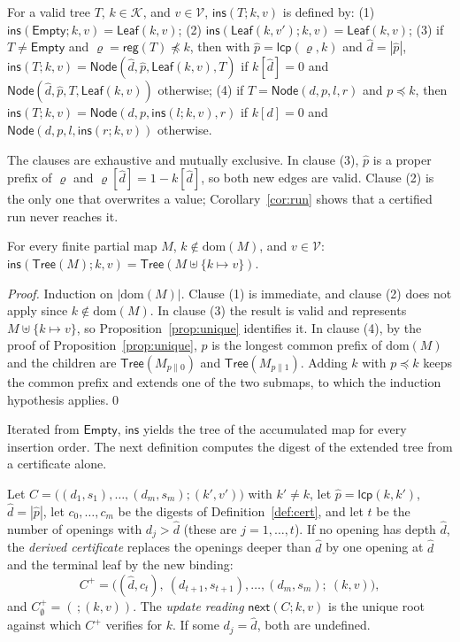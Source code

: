 \documentclass[runningheads]{llncs}
\newcommand{\Tree}{\mathsf{Tree}}
\newcommand{\Leaf}{\mathsf{Leaf}}
\newcommand{\Node}{\mathsf{Node}}
\newcommand{\Empty}{\mathsf{Empty}}
\newcommand{\reg}{\mathsf{reg}}
\newcommand{\ins}{\mathsf{ins}}
\newcommand{\nxt}{\mathsf{next}}
\newcommand{\lcp}{\mathsf{lcp}}
\newcommand{\dom}{\mathrm{dom}}
\newcommand{\cat}{\mathbin{\|}}
\newcommand{\K}{\mathcal{K}}
\newcommand{\V}{\mathcal{V}}
\begin{document}
\begin{definition}[Insertion]\label{def:ins}
For a valid tree $T$, $k \in \K$, and $v \in \V$, $\ins(T;k,v)$ is defined by:
(1) $\ins(\Empty;k,v) = \Leaf(k,v)$;
(2) $\ins(\Leaf(k,v');k,v) = \Leaf(k,v)$;
(3) if $T \neq \Empty$ and $\varrho = \reg(T) \not\preceq k$, then with $\hat p = \lcp(\varrho,k)$ and $\hat d = |\hat p|$, $\ins(T;k,v) = \Node(\hat d,\hat p,\Leaf(k,v),T)$ if $k[\hat d] = 0$ and $\Node(\hat d,\hat p,T,\Leaf(k,v))$ otherwise;
(4) if $T = \Node(d,p,l,r)$ and $p \preceq k$, then $\ins(T;k,v) = \Node(d,p,\ins(l;k,v),r)$ if $k[d] = 0$ and $\Node(d,p,l,\ins(r;k,v))$ otherwise.
\end{definition}

The clauses are exhaustive and mutually exclusive. In clause (3), $\hat p$ is a proper prefix of $\varrho$ and $\varrho[\hat d] = 1 - k[\hat d]$, so both new edges are valid. Clause (2) is the only one that overwrites a value; Corollary~\ref{cor:run} shows that a certified run never reaches it.

\begin{lemma}[Canonicity]\label{lem:canon}
For every finite partial map $M$, $k \notin \dom(M)$, and $v \in \V$: $\ins(\Tree(M);k,v) = \Tree(M \uplus \{k \mapsto v\})$.
\end{lemma}
\begin{proof}
Induction on $|\dom(M)|$. Clause (1) is immediate, and clause (2) does not apply since $k \notin \dom(M)$. In clause (3) the result is valid and represents $M \uplus \{k \mapsto v\}$, so Proposition~\ref{prop:unique} identifies it. In clause (4), by the proof of Proposition~\ref{prop:unique}, $p$ is the longest common prefix of $\dom(M)$ and the children are $\Tree(M_{p\cat 0})$ and $\Tree(M_{p\cat 1})$. Adding $k$ with $p \preceq k$ keeps the common prefix and extends one of the two submaps, to which the induction hypothesis applies.\qed
\end{proof}

Iterated from $\Empty$, $\ins$ yields the tree of the accumulated map for every insertion order. The next definition computes the digest of the extended tree from a certificate alone.

\begin{definition}\label{def:next}
Let $C = \big((d_1,s_1),\ldots,(d_m,s_m);(k',v')\big)$ with $k' \neq k$, let $\hat p = \lcp(k,k')$, $\hat d = |\hat p|$, let $c_0,\ldots,c_m$ be the digests of Definition~\ref{def:cert}, and let $t$ be the number of openings with $d_j > \hat d$ (these are $j = 1,\ldots,t$). If no opening has depth $\hat d$, the \emph{derived certificate} replaces the openings deeper than $\hat d$ by one opening at $\hat d$ and the terminal leaf by the new binding:
\[
  C^{+} = \big((\hat d, c_t),\ (d_{t+1}, s_{t+1}),\ldots,(d_m,s_m);\ (k,v)\big),
\]
and $C_\emptyset^{+} = (\,;(k,v))$. The \emph{update reading} $\nxt(C;k,v)$ is the unique root against which $C^{+}$ verifies for $k$. If some $d_j = \hat d$, both are undefined.
\end{definition}
\end{document}
